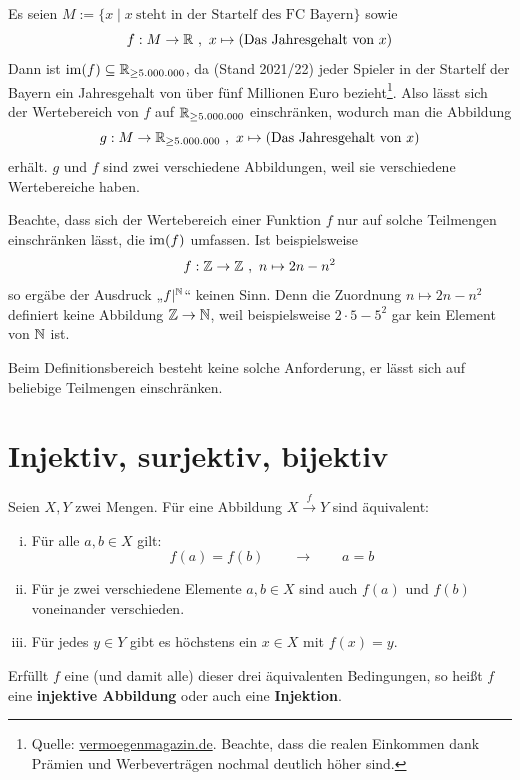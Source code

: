 \begin{bsp}
    Es seien $M := \{ x\mid x\ \text{steht in der Startelf des FC Bayern} \}$ sowie
        \[ f : M \to \mathbb R \ ,\ x \mapsto (\text{Das Jahresgehalt von $x$}) \]
    Dann ist $\operatorname{im}(f)\subseteq \mathbb R_{\ge 5.000.000}$, da (Stand 2021/22) jeder Spieler in der Startelf der Bayern ein Jahresgehalt von über fünf Millionen Euro bezieht\footnote{Quelle: \href{https://www.vermoegenmagazin.de/bayern-muenchen-gehaelter/}{vermoegenmagazin.de}. Beachte, dass die realen Einkommen dank Prämien und Werbeverträgen nochmal deutlich höher sind.}. Also lässt sich der Wertebereich von $f$ auf $\mathbb R_{\ge 5.000.000}$ einschränken, wodurch man die Abbildung
        \[ g: M \to \mathbb R_{\ge 5.000.000} \ ,\ x \mapsto (\text{Das Jahresgehalt von $x$}) \]
    erhält. $g$ und $f$ sind zwei verschiedene Abbildungen, weil sie verschiedene Wertebereiche haben.
\end{bsp}


\begin{bem}
    Beachte, dass sich der Wertebereich einer Funktion $f$ nur auf solche Teilmengen einschränken lässt, die $\operatorname{im}(f)$ umfassen. Ist beispielsweise
        \[ f : \mathbb Z \to \mathbb Z \ ,\ n \mapsto 2n-n^2 \]
    so ergäbe der Ausdruck „$f\vert^{\mathbb N}$“ keinen Sinn. Denn die Zuordnung $n\mapsto 2n-n^2$ definiert keine Abbildung $\mathbb Z\to \mathbb N$, weil beispielsweise $2\cdot 5 - 5^2$ gar kein Element von $\mathbb N$ ist.

    Beim Definitionsbereich besteht keine solche Anforderung, er lässt sich auf beliebige Teilmengen einschränken.
\end{bem}





\section{Injektiv, surjektiv, bijektiv}


\begin{de} \label{def:injektiv} 
    Seien $X, Y$ zwei Mengen. Für eine Abbildung $X \xrightarrow{f} Y$ sind äquivalent:
    \begin{enumerate}[(i)]
        \item Für alle $a,b\in X$ gilt:
            \[ f(a)=f(b) \qquad\to\qquad a=b \]
        \item Für je zwei verschiedene Elemente $a,b \in X$ sind auch $f(a)$ und $f(b)$ voneinander verschieden.
        \item Für jedes $y\in Y$ gibt es höchstens ein $x\in X$ mit $f(x)=y$.
    \end{enumerate}
    Erfüllt $f$ eine (und damit alle) dieser drei äquivalenten Bedingungen, so heißt $f$ eine \textbf{injektive Abbildung} oder auch eine \textbf{Injektion}.
\end{de}


